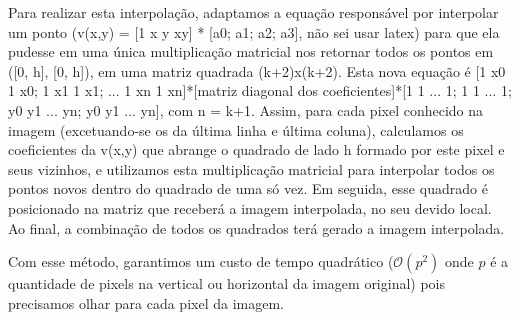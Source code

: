 \documentclass{article}
\begin{document}
	 Para realizar esta interpolação, adaptamos a equação responsável por interpolar um ponto (v(x,y) = [1 x y xy] * [a0; a1; a2; a3], não sei usar latex) para que ela pudesse em uma única multiplicação matricial nos retornar todos os pontos em ([0, h], [0, h]), em uma matriz quadrada (k+2)x(k+2). Esta nova equação é [1 x0 1 x0; 1 x1 1 x1; ... 1 xn 1 xn]*[matriz diagonal dos coeficientes]*[1 1 ... 1; 1 1 ... 1; y0 y1 ... yn; y0 y1 ... yn], com n = k+1. Assim, para cada pixel conhecido na imagem (excetuando-se os da última linha e última coluna), calculamos os coeficientes da v(x,y) que abrange o quadrado de lado h formado por este pixel e seus vizinhos, e utilizamos esta multiplicação matricial para interpolar todos os pontos novos dentro do quadrado de uma só vez. Em seguida, esse quadrado é posicionado na matriz que receberá a imagem interpolada, no seu devido local. Ao final, a combinação de todos os quadrados terá gerado a imagem interpolada. \par
	 Com esse método, garantimos um custo de tempo quadrático ($\mathcal{O}(p^2)$ onde $p$ é a quantidade de pixels na vertical ou horizontal da imagem original) pois precisamos olhar para cada pixel da imagem.
\end{document}
